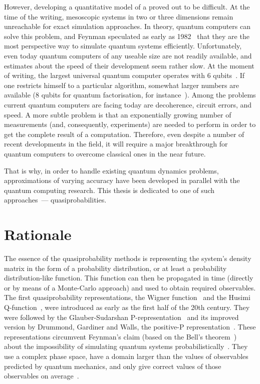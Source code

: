 However, developing a quantitative model of a  proved out to be difficult.
At the time of the writing, mesoscopic systems in two or three dimensions remain unreachable for exact simulation approaches.
In theory, quantum computers can solve this problem, and Feynman speculated as early as 1982~\cite{Feynman1982} that they are the most perspective way to simulate quantum systems efficiently.
Unfortunately, even today quantum computers of any useable size are not readily available, and estimates about the speed of their development seem rather slow.
At the moment of writing, the largest universal quantum computer operates with 6 qubits~\cite{Lanyon2011}.
If one restricts himself to a particular algorithm, somewhat larger numbers are available (8 qubits for quantum factorisation, for instance~\cite{Xu2012}).
Among the problems current quantum computers are facing today are decoherence, circuit errors, and speed.
A more subtle problem is that an exponentially growing number of measurements (and, consequently, experiments) are needed to perform in order to get the complete result of a computation.
Therefore, even despite a number of recent developments in the field, it will require a major breakthrough for quantum computers to overcome classical ones in the near future.

That is why, in order to handle existing quantum dynamics problems, approximations of varying accuracy have been developed in parallel with the quantum computing research.
This thesis is dedicated to one of such approaches~--- quasiprobabilities.


\section{Rationale}

The essence of the quasiprobability methods is representing the system's density matrix in the form of a probability distribution, or at least a probability distribution-like function.
This function can then be propagated in time (directly or by means of a Monte-Carlo approach) and used to obtain required observables.
The first quasiprobability representations, the Wigner function~\cite{Wigner1932,Dirac1945,Moyal1947} and the Husimi Q-function~\cite{Husimi1940}, were introduced as early as the first half of the 20th century.
They were followed by the Glauber-Sudarshan P-representation~\cite{Sudarshan1963,Glauber1963b,Glauber1963} and its improved version by Drummond, Gardiner and Walls, the positive-P representation~\cite{Drummond1980,Drummond1981}.
These representations circumvent Feynman's claim (based on the Bell's theorem~\cite{Bell1964}) about the impossibility of simulating quantum systems probabilistically~\cite{Feynman1982}.
They use a complex phase space, have a domain larger than the values of observables predicted by quantum mechanics, and only give correct values of those observables on average~\cite{Opanchuk2013-bell-sim}.

